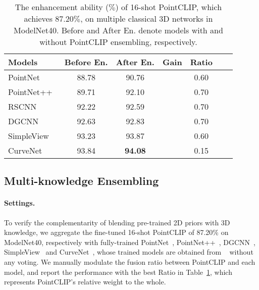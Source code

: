 \documentclass[10pt,twocolumn,letterpaper]{article}
\begin{document}
\begin{table}[t]
\centering
\vspace*{13pt}
\begin{adjustbox}{width=\linewidth}
	\begin{tabular}{lcccccc}
	\toprule
		Models & Before En. & After En. & Gain &Ratio\\ \midrule
		PointNet~\cite{qi2017pointnet} &88.78 &90.76 &\color{blue}{+1.98} &0.60\\
		PointNet++~\cite{qi2017pointnet++} & 89.71 & 92.10 &\color{blue}{+2.39} &0.70\\
		RSCNN~\cite{liu2019relation} & 92.22 & 92.59 &\color{blue}{+0.37} &0.70\\
		DGCNN~\cite{wang2019dynamic} & 92.63 & 92.83  &\color{blue}{+0.20} &0.70\\
		SimpleView~\cite{goyal2021revisiting} & 93.23 & 93.87 & \color{blue}{+0.64} &0.60\\
		CurveNet~\cite{muzahid2020curvenet} & 93.84 & \textbf{94.08} & \color{blue}{+0.24} &0.15\\
	\bottomrule
	\end{tabular}
\end{adjustbox}
\caption{The enhancement ability ($\%$) of 16-shot PointCLIP, which achieves 87.20$\%$, on multiple classical 3D networks in ModelNet40. Before and After En. denote models with and without PointCLIP ensembling, respectively.}
\vspace*{-12pt}
\label{ensemble}
\end{table}


\vspace*{1pt}
\subsection{Multi-knowledge Ensembling}

\paragraph{Settings.} To verify the complementarity of blending pre-trained 2D priors with 3D knowledge, we aggregate the fine-tuned 16-shot PointCLIP of 87.20$\%$ on ModelNet40, respectively with fully-trained PointNet~\cite{qi2017pointnet}, PointNet++~\cite{qi2017pointnet++}, DGCNN~\cite{wang2019dynamic}, SimpleView~\cite{goyal2021revisiting} and CurveNet~\cite{muzahid2020curvenet}, whose trained models are obtained from ~\cite{simpleview2021,curvenet} without any voting. We manually modulate the fusion ratio between PointCLIP and each model, and report the performance with the best Ratio in Table~\ref{ensemble}, which represents PointCLIP's relative weight to the whole.
\end{document}
